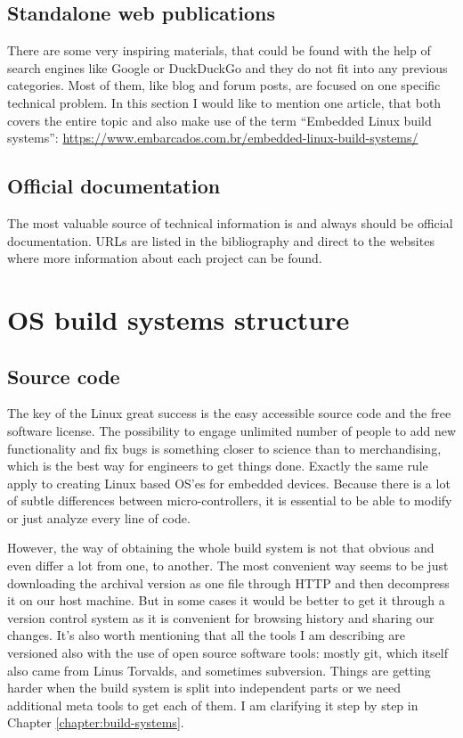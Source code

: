 \documentclass[printmode]{mgr}
\begin{document}
\subsection*{Standalone web publications}

There are some very inspiring materials, that could be found with the help of search engines like Google or DuckDuckGo and they do not fit into any previous categories.
Most of them, like blog and forum posts, are focused on one specific technical problem.
In this section I would like to mention one article, that both covers the entire topic and also make use of the term ``Embedded Linux build systems'': \url{https://www.embarcados.com.br/embedded-linux-build-systems/}

\subsection*{Official documentation}
The most valuable source of technical information is and always should be official documentation. URLs are listed in the bibliography and direct to the websites where more information about each project can be found.



\section{OS build systems structure}
\label{section:builders-structure}

\subsection*{Source code}

The key of the Linux great success is the easy accessible source code and the free software license. The possibility to engage unlimited number of people to add new functionality and fix bugs is something closer to science than to merchandising, which is the best way for engineers to get things done. Exactly the same rule apply to creating Linux based OS'es for embedded devices. Because there is a lot of subtle differences between micro-controllers, it is essential to be able to modify or just analyze every line of code.

However, the way of obtaining the whole build system is not that obvious and even differ a lot from one, to another. The most convenient way seems to be just downloading the archival version as one file through HTTP and then decompress it on our host machine. But in some cases it would be better to get it through a version control system as it is convenient for browsing history and sharing our changes. It's also worth mentioning that all the tools I am describing are versioned also with the use of open source software tools: mostly git, which itself also came from Linus Torvalds, and sometimes subversion. Things are getting harder when the build system is split into independent parts or we need additional meta tools to get each of them. I am clarifying it step by step in Chapter \ref{chapter:build-systems}.
\end{document}
